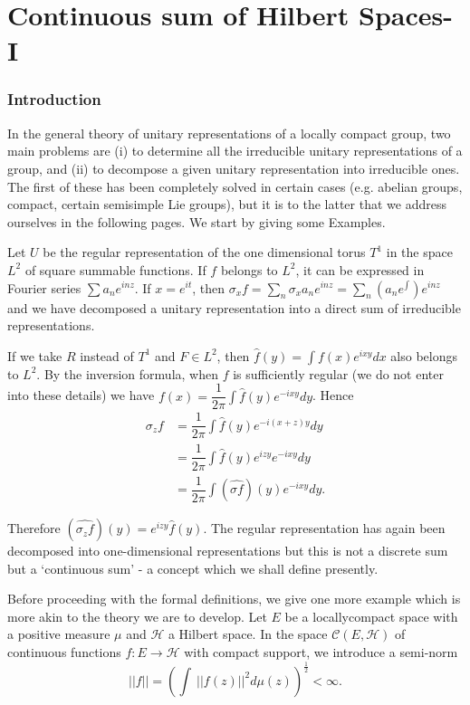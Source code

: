 \chapter{Continuous sum of Hilbert Spaces-I}\label{partIII-chap1}

\setcounter{section}{1}
\setcounter{subsection}{0}
\subsection{Introduction}\label{partIII-chap1-sec1.1}\pageoriginale%

In the general theory of unitary representations of a locally compact
group, two main problems are (i) to determine all the irreducible
unitary representations of a group, and (ii) to decompose a given
unitary representation into irreducible ones. The first of these has
been completely solved in certain cases (e.g. abelian groups, compact,
certain semisimple Lie groups), but it is to the latter that we
address ourselves in the following pages. We start by giving some
Examples. 

Let $U$ be the regular representation of the one dimensional torus
$T^1$ in the space $L^2$ of square summable functions. If $f$ belongs
to $L^2$, it can be expressed in Fourier series $\sum  a_n
e^{inz}$. If  $x = e ^{it}$, then $\sigma_x f = \sum\limits_n
\sigma_{x} a_{n} e^{inz} =   
\sum\limits_n (a_{n} e^{\int}) e^{inz}$  and we have decomposed a
unitary representation into a direct sum of irreducible
representations. 

If we take $R$ instead of $T^1$ and $F \in L^2$, then $\hat{f}(y) =
\int f(x)e^{ixy}dx$ also belongs to $L^2$. By the inversion formula,
when $f$ is sufficiently regular (we do not enter into these details)
we have $f(x) = \dfrac{1}{2 \pi} \int\hat{f}(y)e^{-ixy}dy$. Hence
\begin{align*}
\sigma_z f &= \dfrac{1}{2\pi} \int \hat{f}(y)e^{-i(x+z)y}dy\\ 
&=\dfrac{1}{2\pi}\int\hat{f}(y)e^{izy}e^{-ixy}dy\\
&= \dfrac{1}{2\pi} \int(\hat{\sigma f})(y)e^{-ixy}dy.
\end{align*}

Therefore $(\hat{\sigma_z
  f})(y) = e^{izy}\hat{f}(y)$. The regular representation has again
been decomposed into one-dimensional representations but this is not a
discrete sum but a `continuous sum' - a concept which we shall define
presently. 
 
Before proceeding with the formal definitions, we give one more
example which is more akin to the theory we are to develop. Let $E$ be
a locally\pageoriginale compact space with a positive measure $\mu$ and
$\mathscr{H}$ a Hilbert space. In the space
$\mathscr{C}(E,\mathscr{H})$ of continuous functions $f : E \to
\mathscr{H}$ with compact support, we introduce a semi-norm 
$$
|| f ||=\left( \int\ || f(z) ||^{2} d \mu (z)\right)^{\frac{1}{2}} <
\infty.
$$  

